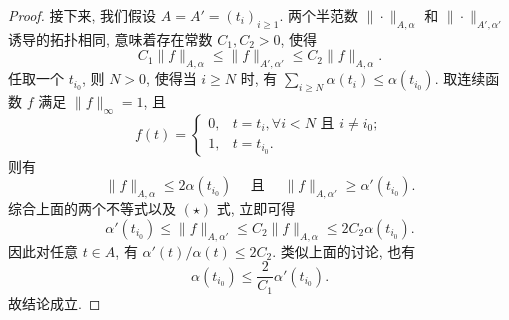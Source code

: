 \begin{proof}
    接下来, 我们假设 $A=A'=(t_i)_{i\geq 1}$. 两个半范数 $\|\cdot\|_{A,\alpha}$ 和 $\|\cdot\|_{A',\alpha'}$
    诱导的拓扑相同, 意味着存在常数 $C_1,C_2>0$, 使得
    \begin{equation}
        C_1\|f\|_{A,\alpha}\leq\|f\|_{A',\alpha'}\leq C_2\|f\|_{A,\alpha}.\tag{$\star$}
    \end{equation}
    任取一个 $t_{i_0}$, 则 $N>0$, 使得当 $i\geq N$ 时, 
    有 $\sum_{i\geq N} \alpha(t_i)\leq\alpha(t_{i_0})$. 取连续函数 $f$ 满足 $\|f\|_{\infty}=1$, 且
    \[
    f(t)=
    \begin{cases}
        0, & t=t_{i},\forall i<N \text {\ 且\ }i\neq i_{0}; \\
        1, & t=t_{i_{0}}.
    \end{cases}\]
    则有
    \[\|f\|_{A, \alpha}\leq 2\alpha(t_{i_0})\quad\text{ 且 }\quad\|f\|_{A,\alpha'}\geq\alpha'(t_{i_{0}}).\]
    综合上面的两个不等式以及 $(\star)$ 式, 立即可得
    \[\alpha'(t_{i_{0}}) \leq\|f\|_{A, \alpha'} \leq C_{2}\|f\|_{A,\alpha}\leq 2C_2\alpha(t_{i_{0}}).\]
    因此对任意 $t\in A$, 有 $\alpha'(t)/\alpha(t)\leq 2C_2$. 类似上面的讨论, 也有
    \[
    \alpha(t_{i_0})\leq\frac{2}{C_{1}}\alpha'(t_{i_{0}}).
    \]
    故结论成立.
\end{proof}

